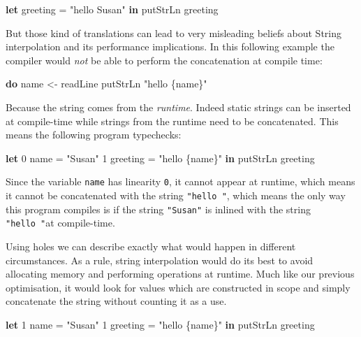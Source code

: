 \documentclass[
]{article}
\newenvironment{Shaded}{}{}
\newcommand{\DecValTok}[1]{\textcolor[rgb]{0.25,0.63,0.44}{#1}}
\newcommand{\FunctionTok}[1]{\textcolor[rgb]{0.02,0.16,0.49}{#1}}
\newcommand{\KeywordTok}[1]{\textcolor[rgb]{0.00,0.44,0.13}{\textbf{#1}}}
\newcommand{\NormalTok}[1]{#1}
\newcommand{\OtherTok}[1]{\textcolor[rgb]{0.00,0.44,0.13}{#1}}
\newcommand{\StringTok}[1]{\textcolor[rgb]{0.25,0.44,0.63}{#1}}
\begin{document}
\begin{Shaded}
\begin{Highlighting}[]
\KeywordTok{let}\NormalTok{ greeting }\OtherTok{=} \StringTok{"hello Susan"} \KeywordTok{in} 
    \FunctionTok{putStrLn}\NormalTok{ greeting}
\end{Highlighting}
\end{Shaded}

But those kind of translations can lead to very misleading beliefs about
String interpolation and its performance implications. In this following
example the compiler would \emph{not} be able to perform the
concatenation at compile time:

\begin{Shaded}
\begin{Highlighting}[]
\KeywordTok{do}\NormalTok{ name }\OtherTok{\textless{}{-}}\NormalTok{ readLine}
   \FunctionTok{putStrLn} \StringTok{"hello \{name\}"}
\end{Highlighting}
\end{Shaded}

Because the string comes from the \emph{runtime}. Indeed static strings
can be inserted at compile-time while strings from the runtime need to
be concatenated. This means the following program typechecks:

\begin{Shaded}
\begin{Highlighting}[]
\KeywordTok{let} \DecValTok{0}\NormalTok{ name }\OtherTok{=} \StringTok{"Susan"} 
    \DecValTok{1}\NormalTok{ greeting }\OtherTok{=} \StringTok{"hello \{name\}"} \KeywordTok{in}
    \FunctionTok{putStrLn}\NormalTok{ greeting}
\end{Highlighting}
\end{Shaded}

Since the variable \texttt{name} has linearity \texttt{0}, it cannot
appear at runtime, which means it cannot be concatenated with the string
\texttt{"hello\ "}, which means the only way this program compiles is if
the string \texttt{"Susan"} is inlined with the string
\texttt{"hello\ "}at compile-time.

Using holes we can describe exactly what would happen in different
circumstances. As a rule, string interpolation would do its best to
avoid allocating memory and performing operations at runtime. Much like
our previous optimisation, it would look for values which are
constructed in scope and simply concatenate the string without counting
it as a use.

\begin{Shaded}
\begin{Highlighting}[]
\KeywordTok{let} \DecValTok{1}\NormalTok{ name }\OtherTok{=} \StringTok{"Susan"}
    \DecValTok{1}\NormalTok{ greeting }\OtherTok{=} \StringTok{"hello \{name\}"} \KeywordTok{in}
    \FunctionTok{putStrLn}\NormalTok{ greeting}
\end{Highlighting}
\end{Shaded}
\end{document}
